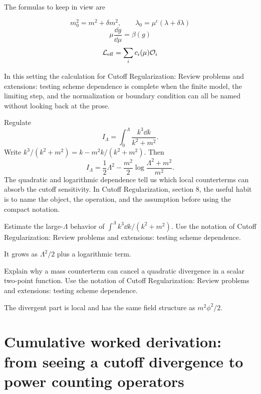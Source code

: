 The formulas to keep in view are

\[
  m_0^2=m^2+\delta m^2,\qquad \lambda_0=\mu^\epsilon(\lambda+\delta\lambda)
\]
\[
  \mu\frac{\dd g}{\dd\mu}=\beta(g)
\]
\[
  \mathcal L_{\mathrm{eff}}=\sum_i c_i(\mu)\mathcal O_i
\]

In this setting the calculation for Cutoff Regularization: Review problems and extensions: testing scheme dependence is complete when the finite model, the limiting step, and the normalization or boundary condition can all be named without looking back at the prose.




\begin{example}
Regulate
\[
  I_\Lambda=\int_0^\Lambda\frac{k^3\dd k}{k^2+m^2}.
\]
Write \(k^3/(k^2+m^2)=k-m^2k/(k^2+m^2)\).  Then
\[
  I_\Lambda=\frac12\Lambda^2-\frac{m^2}{2}\log\frac{\Lambda^2+m^2}{m^2}.
\]
The quadratic and logarithmic dependence tell us which local counterterms can absorb the cutoff sensitivity.  In Cutoff Regularization, section 8, the useful habit is to name the object, the operation, and the assumption before using the compact notation.
\end{example}



\begin{exercise}
Estimate the large-\(\Lambda\) behavior of \(\int^\Lambda k^3\dd k/(k^2+m^2)\).  Use the notation of Cutoff Regularization: Review problems and extensions: testing scheme dependence.
\begin{answer}
It grows as \(\Lambda^2/2\) plus a logarithmic term.
\end{answer}
\end{exercise}

\begin{exercise}
Explain why a mass counterterm can cancel a quadratic divergence in a scalar two-point function.  Use the notation of Cutoff Regularization: Review problems and extensions: testing scheme dependence.
\begin{answer}
The divergent part is local and has the same field structure as \(m^2\phi^2/2\).
\end{answer}
\end{exercise}



\section{Cumulative worked derivation: from seeing a cutoff divergence to power counting operators}


